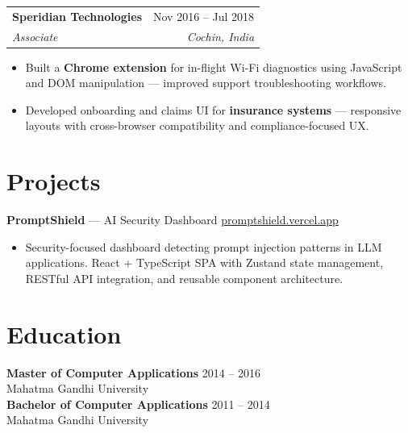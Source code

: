 \documentclass[11pt,a4paper]{article}
\makeatletter
\newcommand{\job}[4]{
\vspace{4pt}
\begin{tabular*}{\textwidth}{l@{\extracolsep{\fill}}r}
\textbf{#1} & #2 \\
\textit{#3} & \textit{#4} \\
\end{tabular*}
\vspace{2pt}
}
\makeatother
\begin{document}
\job
{Speridian Technologies}
{Nov 2016 -- Jul 2018}
{Associate}
{Cochin, India}

\begin{itemize}
\item Built a \textbf{Chrome extension} for in-flight Wi-Fi diagnostics using JavaScript and DOM manipulation — improved support troubleshooting workflows.
\item Developed onboarding and claims UI for \textbf{insurance systems} — responsive layouts with cross-browser compatibility and compliance-focused UX.
\end{itemize}

\section*{Projects}

\textbf{PromptShield} — AI Security Dashboard \hfill \href{https://promptshield.vercel.app}{promptshield.vercel.app}

\begin{itemize}
\item Security-focused dashboard detecting prompt injection patterns in LLM applications. React + TypeScript SPA with Zustand state management, RESTful API integration, and reusable component architecture.
\end{itemize}

\section*{Education}

\textbf{Master of Computer Applications} \hfill 2014 -- 2016 \\
Mahatma Gandhi University \\[4pt]
\textbf{Bachelor of Computer Applications} \hfill 2011 -- 2014 \\
Mahatma Gandhi University
\end{document}
